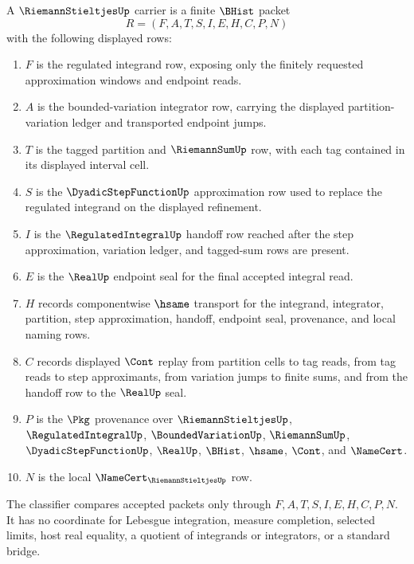 \begin{definition}
\label{def:riemann-stieltjes-carrier}
A $\RiemannStieltjesUp$ carrier is a finite $\BHist$ packet
$$
R=(F,A,T,S,I,E,H,C,P,N)
$$
with the following displayed rows:
\begin{enumerate}
\item $F$ is the regulated integrand row, exposing only the finitely requested approximation windows and endpoint reads.
\item $A$ is the bounded-variation integrator row, carrying the displayed partition-variation ledger and transported endpoint jumps.
\item $T$ is the tagged partition and $\RiemannSumUp$ row, with each tag contained in its displayed interval cell.
\item $S$ is the $\DyadicStepFunctionUp$ approximation row used to replace the regulated integrand on the displayed refinement.
\item $I$ is the $\RegulatedIntegralUp$ handoff row reached after the step approximation, variation ledger, and tagged-sum rows are present.
\item $E$ is the $\RealUp$ endpoint seal for the final accepted integral read.
\item $H$ records componentwise $\hsame$ transport for the integrand, integrator, partition, step approximation, handoff, endpoint seal, provenance, and local naming rows.
\item $C$ records displayed $\Cont$ replay from partition cells to tag reads, from tag reads to step approximants, from variation jumps to finite sums, and from the handoff row to the $\RealUp$ seal.
\item $P$ is the $\Pkg$ provenance over $\RiemannStieltjesUp$, $\RegulatedIntegralUp$, $\BoundedVariationUp$, $\RiemannSumUp$, $\DyadicStepFunctionUp$, $\RealUp$, $\BHist$, $\hsame$, $\Cont$, and $\NameCert$.
\item $N$ is the local $\NameCert_{\RiemannStieltjesUp}$ row.
\end{enumerate}
The classifier compares accepted packets only through $F,A,T,S,I,E,H,C,P,N$. It has no coordinate for Lebesgue integration, measure completion, selected limits, host real equality, a quotient of integrands or integrators, or a standard bridge.
\end{definition}

